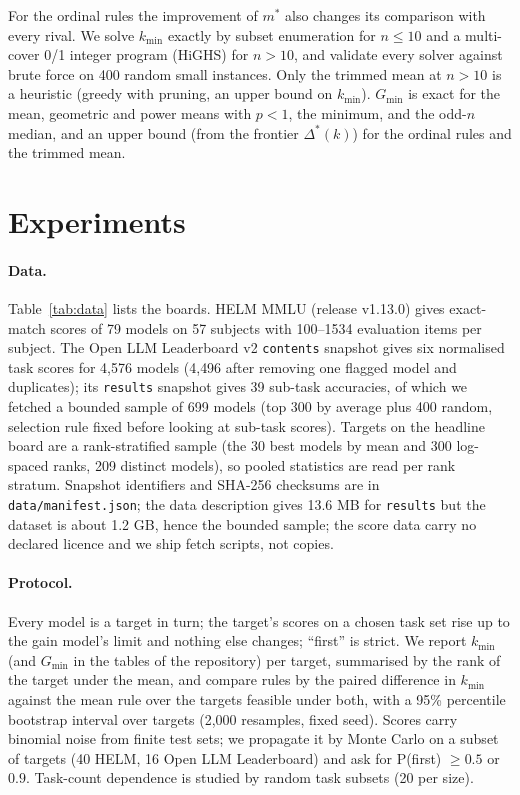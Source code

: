\documentclass{article}
\begin{document}
For the ordinal rules the improvement of $m^\ast$ also changes its comparison with every rival. We solve $k_{\min}$ exactly by subset enumeration for $n\le10$ and a multi-cover 0/1 integer program (HiGHS) for $n>10$, and validate every solver against brute force on 400 random small instances. Only the trimmed mean at $n>10$ is a heuristic (greedy with pruning, an upper bound on $k_{\min}$). $G_{\min}$ is exact for the mean, geometric and power means with $p<1$, the minimum, and the odd-$n$ median, and an upper bound (from the frontier $\Delta^\ast(k)$) for the ordinal rules and the trimmed mean.

\section{Experiments}
\label{sec:exp}
\paragraph{Data.}
Table~\ref{tab:data} lists the boards. HELM MMLU (release v1.13.0) gives exact-match scores of 79 models on 57 subjects with 100--1534 evaluation items per subject. The Open LLM Leaderboard v2 \texttt{contents} snapshot gives six normalised task scores for 4{,}576 models (4{,}496 after removing one flagged model and duplicates); its \texttt{results} snapshot gives 39 sub-task accuracies, of which we fetched a bounded sample of 699 models (top 300 by average plus 400 random, selection rule fixed before looking at sub-task scores). Targets on the headline board are a rank-stratified sample (the 30 best models by mean and 300 log-spaced ranks, 209 distinct models), so pooled statistics are read per rank stratum. Snapshot identifiers and SHA-256 checksums are in \texttt{data/manifest.json}; the data description gives 13.6 MB for \texttt{results} but the dataset is about 1.2 GB, hence the bounded sample; the score data carry no declared licence and we ship fetch scripts, not copies.
\begin{table}[t]
\caption{Boards and snapshots.}\label{tab:data}
\centering\footnotesize\resizebox{\linewidth}{!}{}
\end{table}

\paragraph{Protocol.}
Every model is a target in turn; the target's scores on a chosen task set rise up to the gain model's limit and nothing else changes; ``first'' is strict. We report $k_{\min}$ (and $G_{\min}$ in the tables of the repository) per target, summarised by the rank of the target under the mean, and compare rules by the paired difference in $k_{\min}$ against the mean rule over the targets feasible under both, with a 95\% percentile bootstrap interval over targets (2{,}000 resamples, fixed seed). Scores carry binomial noise from finite test sets; we propagate it by Monte Carlo on a subset of targets (40 HELM, 16 Open LLM Leaderboard) and ask for P(first) $\ge0.5$ or $0.9$. Task-count dependence is studied by random task subsets (20 per size).
\end{document}
